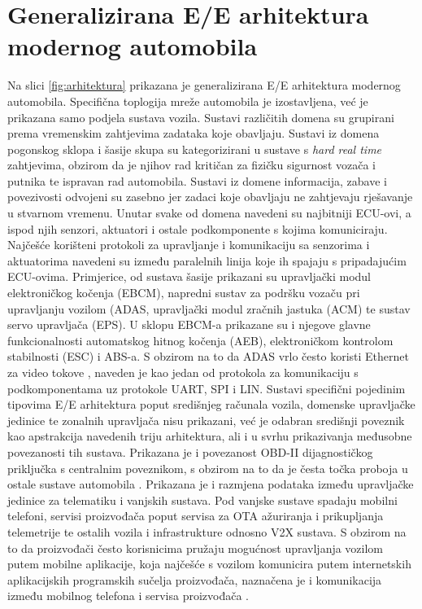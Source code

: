 \documentclass[times, utf8, diplomski, numeric]{fer}
\begin{document}
\section{Generalizirana E/E arhitektura modernog automobila}
Na slici \ref{fig:arhitektura} prikazana je generalizirana E/E arhitektura modernog automobila. Specifična toplogija mreže automobila je izostavljena, već je prikazana samo podjela sustava vozila. Sustavi različitih domena su grupirani prema vremenskim zahtjevima zadataka koje obavljaju. Sustavi iz domena pogonskog sklopa i šasije skupa su kategorizirani u sustave s \textit{hard real time} zahtjevima, obzirom da je njihov rad kritičan za fizičku sigurnost vozača i putnika te ispravan rad automobila. Sustavi iz domene informacija, zabave i povezivosti odvojeni su zasebno jer zadaci koje obavljaju ne zahtjevaju rješavanje u stvarnom vremenu. Unutar svake od domena navedeni su najbitniji ECU-ovi, a ispod njih senzori, aktuatori i ostale podkomponente s kojima komuniciraju. Najčešće korišteni protokoli za upravljanje i komunikaciju sa senzorima i aktuatorima navedeni su između paralelnih linija koje ih spajaju s pripadajućim ECU-ovima. Primjerice, od sustava šasije prikazani su upravljački modul elektroničkog kočenja (EBCM), napredni sustav za podršku vozaču pri upravljanju vozilom (ADAS, upravljački modul zračnih jastuka (ACM) te sustav servo upravljača (EPS). U sklopu EBCM-a prikazane su i njegove glavne funkcionalnosti automatskog hitnog kočenja (AEB), elektroničkom kontrolom stabilnosti (ESC) i ABS-a. S obzirom na to da ADAS vrlo često koristi Ethernet za video tokove \cite{nasser2023automotive}, naveden je kao jedan od protokola za komunikaciju s podkomponentama uz protokole UART, SPI i LIN. Sustavi specifični pojedinim tipovima E/E arhitektura poput središnjeg računala vozila, domenske upravljačke jedinice te zonalnih upravljača nisu prikazani, već je odabran središnji poveznik kao apstrakcija navedenih triju arhitektura, ali i u svrhu prikazivanja međusobne povezanosti tih sustava. Prikazana je i povezanost OBD-II dijagnostičkog priključka s centralnim poveznikom, s obzirom na to da je česta točka proboja u ostale sustave automobila \cite{knight2020hacking, smith2016car}. Prikazana je i razmjena podataka između upravljačke jedinice za telematiku i vanjskih sustava. Pod vanjske sustave spadaju mobilni telefoni, servisi proizvođača poput servisa za OTA ažuriranja i prikupljanja telemetrije te ostalih vozila i infrastrukture odnosno V2X sustava. S obzirom na to da proizvođači često korisnicima pružaju mogućnost upravljanja vozilom putem mobilne aplikacije, koja najčešće s vozilom komunicira putem internetskih aplikacijskih programskih sučelja proizvođača, naznačena je i komunikacija između mobilnog telefona i servisa proizvođača \cite{curry2023web}.  
\end{document}

